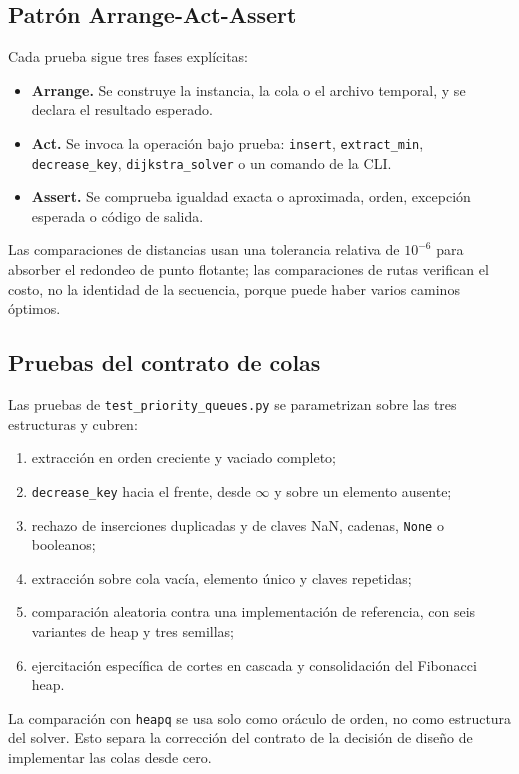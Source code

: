 \subsection{Patrón Arrange-Act-Assert}
Cada prueba sigue tres fases explícitas:
\begin{itemize}
    \item \textbf{Arrange.} Se construye la instancia, la cola o el archivo temporal, y se declara el resultado esperado.
    \item \textbf{Act.} Se invoca la operación bajo prueba: \texttt{insert}, \texttt{extract\_min}, \texttt{decrease\_key}, \texttt{dijkstra\_solver} o un comando de la CLI.
    \item \textbf{Assert.} Se comprueba igualdad exacta o aproximada, orden, excepción esperada o código de salida.
\end{itemize}
Las comparaciones de distancias usan una tolerancia relativa de $10^{-6}$ para absorber el redondeo de punto flotante; las comparaciones de rutas verifican el costo, no la identidad de la secuencia, porque puede haber varios caminos óptimos.

\subsection{Pruebas del contrato de colas}
Las pruebas de \texttt{test\_priority\_queues.py} se parametrizan sobre las tres estructuras y cubren:
\begin{enumerate}
    \item extracción en orden creciente y vaciado completo;
    \item \texttt{decrease\_key} hacia el frente, desde $\infty$ y sobre un elemento ausente;
    \item rechazo de inserciones duplicadas y de claves NaN, cadenas, \texttt{None} o booleanos;
    \item extracción sobre cola vacía, elemento único y claves repetidas;
    \item comparación aleatoria contra una implementación de referencia, con seis variantes de heap y tres semillas;
    \item ejercitación específica de cortes en cascada y consolidación del Fibonacci heap.
\end{enumerate}
La comparación con \texttt{heapq} se usa solo como oráculo de orden, no como estructura del solver. Esto separa la corrección del contrato de la decisión de diseño de implementar las colas desde cero.

